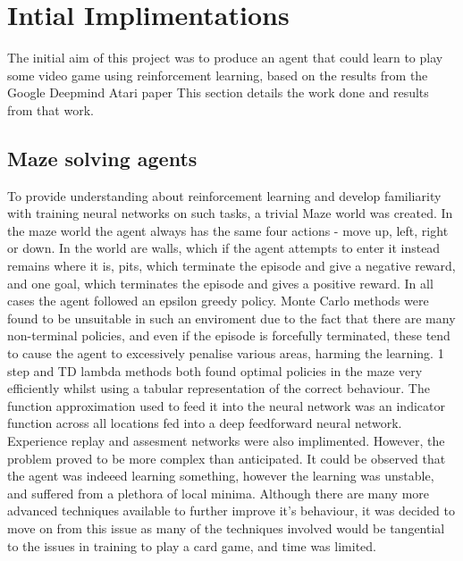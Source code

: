 \section{Intial Implimentations}
The initial aim of this project was to produce an agent that could learn to play some video game using reinforcement learning, based on the results from the Google Deepmind Atari paper \cite{ataripaper} %
This section details the work done and results from that work.
\subsection{Maze solving agents}
To provide understanding about reinforcement learning and develop familiarity with training neural networks on such tasks, a trivial Maze world was created. In the maze world the agent always has the same four actions - move up, left, right or down. In the world are walls, which if the agent attempts to enter it instead remains where it is, pits, which terminate the episode and give a negative reward, and one goal, which terminates the episode and gives a positive reward.
In all cases the agent followed an epsilon greedy policy.
Monte Carlo methods were found to be unsuitable in such an enviroment due to the fact that there are many non-terminal policies, and even if the episode is forcefully terminated, these tend to cause the agent to excessively penalise various areas, harming the learning. 1 step and TD lambda methods both found optimal policies in the maze very efficiently whilst using a tabular representation of the correct behaviour.
The function approximation used to feed it into the neural network was an indicator function across all locations fed into a deep feedforward neural network. Experience replay and assesment networks were also implimented. However, the problem proved to be more complex than anticipated. It could be observed that the agent was indeeed learning something, however the learning was unstable, and suffered from a plethora of local minima. Although there are many more advanced techniques available to further improve it's behaviour, it was decided to move on from this issue as many of the techniques involved would be tangential to the issues in training to play a card game, and time was limited.